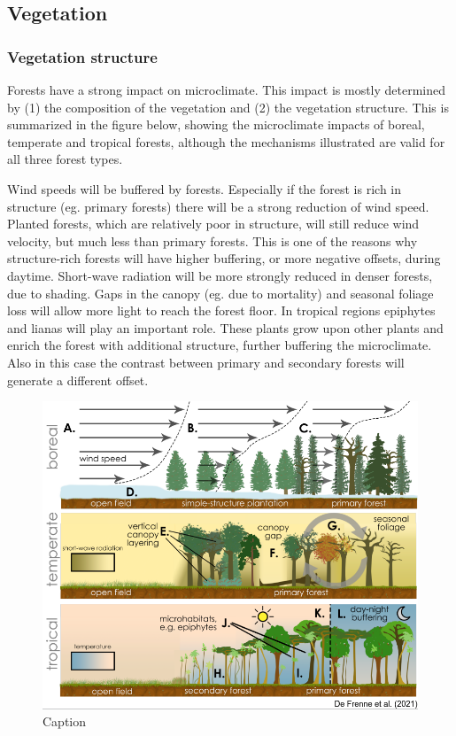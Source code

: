 \documentclass[12pt,oneside]{book}
\begin{document}
\subsection{Vegetation}\label{vegetation}

\subsubsection{Vegetation structure}\label{vegetation-structure}

Forests have a strong impact on microclimate. This impact is mostly
determined by (1) the composition of the vegetation and (2) the
vegetation structure. This is summarized in the figure below, showing
the microclimate impacts of boreal, temperate and tropical forests,
although the mechanisms illustrated are valid for all three forest
types.

Wind speeds will be buffered by forests. Especially if the forest is
rich in structure (eg. primary forests) there will be a strong reduction
of wind speed. Planted forests, which are relatively poor in structure,
will still reduce wind velocity, but much less than primary forests.
This is one of the reasons why structure-rich forests will have higher
buffering, or more negative offsets, during daytime. Short-wave
radiation will be more strongly reduced in denser forests, due to
shading. Gaps in the canopy (eg. due to mortality) and seasonal foliage
loss will allow more light to reach the forest floor. In tropical
regions epiphytes and lianas will play an important role. These plants
grow upon other plants and enrich the forest with additional structure,
further buffering the microclimate. Also in this case the contrast
between primary and secondary forests will generate a different offset.

\begin{figure}

{\centering \includegraphics[width=0.8\linewidth]{figures/Figure1015} 

}

\caption{Caption}\label{fig:Micro15}
\end{figure}
\end{document}
